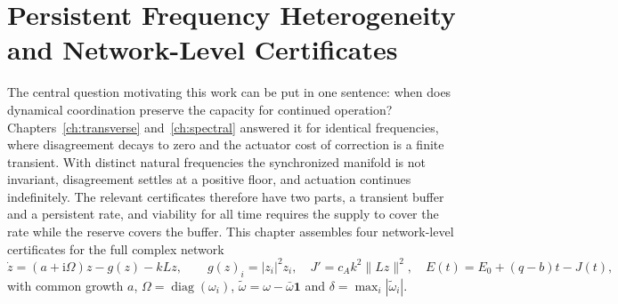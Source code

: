 \documentclass[11pt,notitlepage]{report}
\theoremstyle{definition}
\theoremstyle{remark}
\newcommand{\ii}{\mathrm i}
\newcommand{\one}{\mathbf 1}
\begin{document}
\chapter{Persistent Frequency Heterogeneity and Network-Level Certificates}\label{ch:network}

The central question motivating this work can be put in one sentence: when does dynamical coordination preserve the capacity for continued operation? Chapters~\ref{ch:transverse} and~\ref{ch:spectral} answered it for identical frequencies, where disagreement decays to zero and the actuator cost of correction is a finite transient. With distinct natural frequencies the synchronized manifold is not invariant, disagreement settles at a positive floor, and actuation continues indefinitely. The relevant certificates therefore have two parts, a transient buffer and a persistent rate, and viability for all time requires the supply to cover the rate while the reserve covers the buffer. This chapter assembles four network-level certificates for the full complex network
\begin{equation}\label{eq:hetnet}
\dot z=(a+\ii\Omega)z-g(z)-kLz,\qquad g(z)_i=|z_i|^2z_i,\quad J'=c_Ak^2\|Lz\|^2,\quad E(t)=E_0+(q-b)t-J(t),
\end{equation}
with common growth $a$, $\Omega=\operatorname{diag}(\omega_i)$, $\tilde\omega=\omega-\bar\omega\one$ and $\delta=\max_i|\tilde\omega_i|$.
\end{document}
